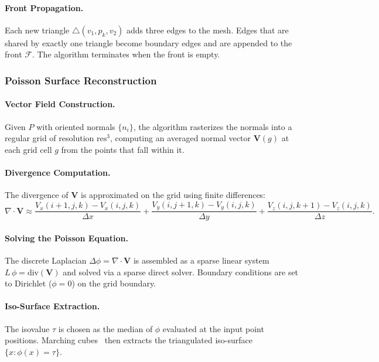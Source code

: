 \paragraph{Front Propagation.}
Each new triangle $\triangle(v_1, p_k, v_2)$ adds three edges to the mesh. Edges that are shared by exactly one triangle become boundary edges and are appended to the front $\mathcal{F}$. The algorithm terminates when the front is empty.

\subsubsection{Poisson Surface Reconstruction}

\paragraph{Vector Field Construction.}
Given $P$ with oriented normals $\{n_i\}$, the algorithm rasterizes the normals into a regular grid of resolution $\text{res}^3$, computing an averaged normal vector $\mathbf{V}(g)$ at each grid cell $g$ from the points that fall within it.

\paragraph{Divergence Computation.}
The divergence of $\mathbf{V}$ is approximated on the grid using finite differences:
$$\nabla \cdot \mathbf{V} \approx \frac{V_{x}(i{+}1,j,k) - V_{x}(i,j,k)}{\Delta x} + \frac{V_{y}(i,j{+}1,k) - V_{y}(i,j,k)}{\Delta y} + \frac{V_{z}(i,j,k{+}1) - V_{z}(i,j,k)}{\Delta z}.$$

\paragraph{Solving the Poisson Equation.}
The discrete Laplacian $\Delta \phi = \nabla \cdot \mathbf{V}$ is assembled as a sparse linear system $L\,\phi = \text{div}(\mathbf{V})$ and solved via a sparse direct solver. Boundary conditions are set to Dirichlet ($\phi = 0$) on the grid boundary.

\paragraph{Iso-Surface Extraction.}
The isovalue $\tau$ is chosen as the median of $\phi$ evaluated at the input point positions. Marching cubes~\cite{lorensen1987} then extracts the triangulated iso-surface $\{x : \phi(x) = \tau\}$.

